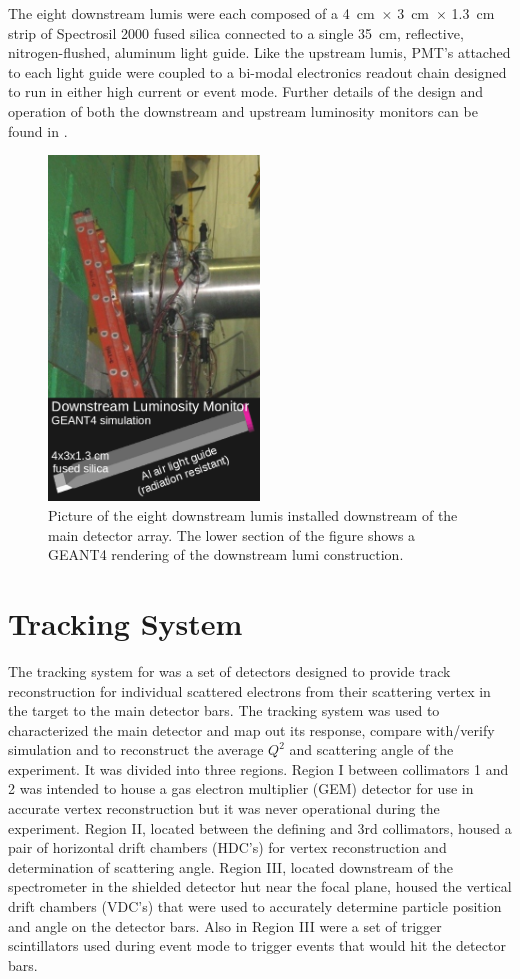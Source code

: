 The eight downstream lumis were each composed of a 4~cm~$\times$ 3~cm~$\times$ 1.3~cm strip of Spectrosil 2000 fused silica connected to a single 35~cm, reflective, nitrogen-flushed, aluminum light guide. Like the upstream lumis, PMT's attached to each light guide were coupled to a bi-modal electronics readout chain designed to run in either high current or event mode. Further details of the design and operation of both the downstream and upstream luminosity monitors can be found in \cite{Leacock2012}. 

\begin{figure}[ht]
\centering
\includegraphics[width=0.5\textwidth]{Pictures/dslumis.png}
\caption{Picture of the eight downstream lumis installed downstream of the main detector array. The lower section of the figure shows a GEANT4 rendering of the downstream lumi construction.}
\label{fig:dslumis}
\end{figure}


\section{Tracking System}
The tracking system for \Qs was a set of detectors designed to provide track reconstruction for individual scattered electrons from their scattering vertex in the target to the main detector bars. The tracking system was used to characterized the main detector and map out its response, compare with/verify simulation and to reconstruct the average $Q^2$ and scattering angle of the experiment. It was divided into three regions. Region I between collimators 1 and 2 was intended to house a gas electron multiplier (GEM) detector for use in accurate vertex reconstruction but it was never operational during the experiment. Region II, located between the defining and 3rd collimators, housed a pair of horizontal drift chambers (HDC's) for vertex reconstruction and determination of scattering angle. Region III, located downstream of the spectrometer in the shielded detector hut near the focal plane, housed the vertical drift chambers (VDC's) that were used to accurately determine particle position and angle on the detector bars. Also in Region III were a set of trigger scintillators used during event mode to trigger events that would hit the detector bars.

